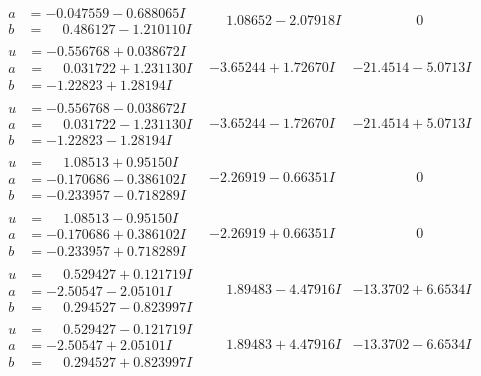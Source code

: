 \documentclass[1p]{elsarticle_modified}
\theoremstyle{definition}
\begin{document}
$$\begin{array}{c|c|c}
\begin{aligned}
a &= -0.047559 - 0.688065 I \\
b &= \phantom{-}0.486127 - 1.210110 I\end{aligned}
 & \phantom{-}1.08652 - 2.07918 I & \phantom{-0.000000 } 0 \\ \hline\begin{aligned}
u &= -0.556768 + 0.038672 I \\
a &= \phantom{-}0.031722 + 1.231130 I \\
b &= -1.22823 + 1.28194 I\end{aligned}
 & -3.65244 + 1.72670 I & -21.4514 - 5.0713 I \\ \hline\begin{aligned}
u &= -0.556768 - 0.038672 I \\
a &= \phantom{-}0.031722 - 1.231130 I \\
b &= -1.22823 - 1.28194 I\end{aligned}
 & -3.65244 - 1.72670 I & -21.4514 + 5.0713 I \\ \hline\begin{aligned}
u &= \phantom{-}1.08513 + 0.95150 I \\
a &= -0.170686 - 0.386102 I \\
b &= -0.233957 - 0.718289 I\end{aligned}
 & -2.26919 - 0.66351 I & \phantom{-0.000000 } 0 \\ \hline\begin{aligned}
u &= \phantom{-}1.08513 - 0.95150 I \\
a &= -0.170686 + 0.386102 I \\
b &= -0.233957 + 0.718289 I\end{aligned}
 & -2.26919 + 0.66351 I & \phantom{-0.000000 } 0 \\ \hline\begin{aligned}
u &= \phantom{-}0.529427 + 0.121719 I \\
a &= -2.50547 - 2.05101 I \\
b &= \phantom{-}0.294527 - 0.823997 I\end{aligned}
 & \phantom{-}1.89483 - 4.47916 I & -13.3702 + 6.6534 I \\ \hline\begin{aligned}
u &= \phantom{-}0.529427 - 0.121719 I \\
a &= -2.50547 + 2.05101 I \\
b &= \phantom{-}0.294527 + 0.823997 I\end{aligned}
 & \phantom{-}1.89483 + 4.47916 I & -13.3702 - 6.6534 I \\ \hline\begin{aligned}

\end{aligned}
\end{array}$$
\end{document}
